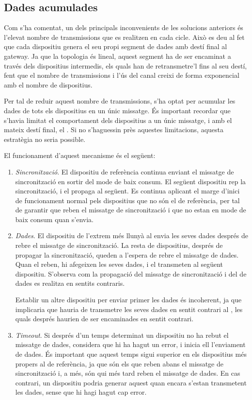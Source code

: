 \documentclass{tfgitic}[2024/07/01]
\begin{document}
{\subsection{Dades acumulades}
Com s'ha comentat, un dels principals inconvenients de les solucions anteriors és l'elevat nombre de transmissions que es realitzen en cada cicle. Això es deu al fet que cada dispositiu genera el seu propi segment de dades amb destí final al gateway. Ja que la topologia és lineal, aquest segment ha de ser encaminat a través dels dispositius intermedis, els quals han de retransmetre'l fins al seu destí, fent que el nombre de transmissions i l'ús del canal creixi de forma exponencial amb el nombre de dispositius. 

Per tal de reduir aquest nombre de transmissions, s'ha optat per acumular les dades de tots els dispositius en un únic missatge. És important recordar que s'havia limitat el comportament dels dispositius a un únic missatge, i amb el mateix destí final, el . Si no s'haguessin près aquestes limitacions, aquesta estratègia no seria possible.

El funcionament d'aquest mecanisme és el següent:
\begin{enumerate}
    \item \emph{Sincronització}. El dispositiu de referència continua enviant el missatge de sincronització en sortir del mode de baix consum. El següent dispositiu rep la sincronització, i el propaga al següent. Es continua aplicant el marge d'inici de funcionament normal pels dispositius que no són el de referència, per tal de garantir que reben el missatge de sincronització i que no estan en mode de baix consum quan s'envia.
    \item \emph{Dades}. El dispositiu de l'extrem més llunyà al  envia les seves dades després de rebre el missatge de sincronització. La resta de dispositius, després de propagar la sincronització, queden a l'espera de rebre el missatge de dades. Quan el reben, hi afegeixen les seves dades, i el transmeten al següent dispositiu. S'observa com la propagació del missatge de sincronització i del de dades es realitza en sentits contraris.
    
    Establir un altre dispositiu per enviar primer les dades és incoherent, ja que implicaria que hauria de transmetre les seves dades en sentit contrari al , les quals després haurien de ser encaminades en sentit contrari.

    \item \emph{Timeout}. Si després d'un temps determinat un dispositiu no ha rebut el missatge de dades, considera que hi ha hagut un error, i inicia ell l'enviament de dades. És important que aquest temps sigui superior en els dispositius més propers al de referència, ja que són els que reben abans el missatge de sincronització i, a més, són qui més tard reben el missatge de dades. En cas contrari, un dispositiu podria generar aquest  quan encara s'estan transmetent les dades, sense que hi hagi hagut cap error. 


\end{enumerate}}
\end{document}
